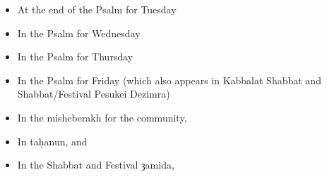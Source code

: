 \documentclass[14pt]{book}
\begin{document}
\begin{itemize}
		\item At the end of the Psalm for Tuesday 
		\item In the Psalm for Wednesday 
		\item In the Psalm for Thursday 
		\item In the Psalm for Friday (which also appears in Kabbalat Shabbat and Shabbat/Festival Pesukei Dezimra) 
		\item In the misheberakh for the community, 
		\item In ta\d{h}anun,  and 
		\item In the Shabbat and Festival ȝamida, 
	\end{itemize}
\end{document}

